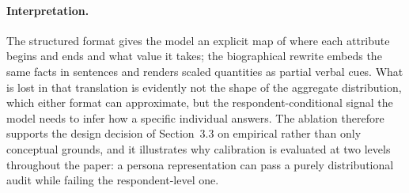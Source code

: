 \paragraph{Interpretation.} The structured format gives the model an
explicit map of where each attribute begins and ends and what value it
takes; the biographical rewrite embeds the same facts in sentences and
renders scaled quantities as partial verbal cues. What is lost in that
translation is evidently not the shape of the aggregate distribution, which
either format can approximate, but the respondent-conditional signal the
model needs to infer how a specific individual answers. The ablation
therefore supports the design decision of Section~3.3 on empirical rather
than only conceptual grounds, and it illustrates why calibration is
evaluated at two levels throughout the paper: a persona representation can
pass a purely distributional audit while failing the respondent-level one.
